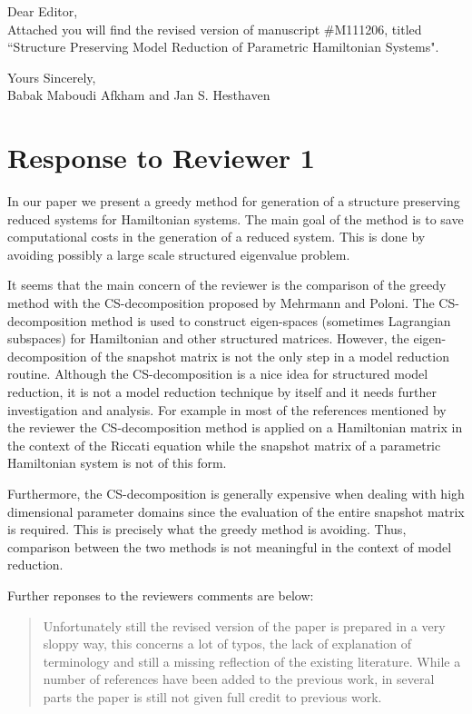 \documentclass[a4paper]{article}
\newcommand{\breview}{\begin{quotation}\begin{bf}\noindent}
\newcommand{\ereview}{\end{bf}\end{quotation}}
\begin{document}
Dear Editor, \\[1cm]

Attached you will find the revised version of manuscript \#M111206, titled ``Structure Preserving Model Reduction of Parametric Hamiltonian Systems".

Yours Sincerely,\\[1.0cm]
Babak Maboudi Afkham and
Jan S. Hesthaven
\\[1cm]

\section*{Response to Reviewer 1}


In our paper we present a greedy method for generation of a structure preserving reduced systems for Hamiltonian systems. The main goal of the method is to save computational costs in the generation of a reduced system. This is done by avoiding possibly a large scale structured eigenvalue problem. 

It seems that the main concern of the reviewer is the comparison of the greedy method with the CS-decomposition proposed by Mehrmann and Poloni. The CS-decomposition method is used to construct eigen-spaces (sometimes Lagrangian subspaces) for Hamiltonian and other structured matrices. However, the eigen-decomposition of the snapshot matrix is not the only step in a model reduction routine. Although the CS-decomposition is a nice idea for structured model reduction, it is not a model reduction technique by itself and it needs further investigation and analysis. For example in most of the references mentioned by the reviewer the CS-decomposition method is applied on a Hamiltonian matrix in the context of the Riccati equation while the snapshot matrix of a parametric Hamiltonian system is not of this form. 

Furthermore, the CS-decomposition is generally expensive when dealing with high dimensional parameter domains since the evaluation of the entire snapshot matrix is required. This is precisely what the greedy method is avoiding. Thus, comparison between the two methods is not meaningful in the context of model reduction.

Further reponses to the reviewers comments are below:
\breview
Unfortunately still the revised version of the paper is prepared in a very sloppy way, this concerns a lot of typos, the lack of explanation of terminology and still a missing reflection of the existing literature. While a number of references have been added to the previous work, in several parts the paper is still not given full credit to previous work.
\ereview
\end{document}
